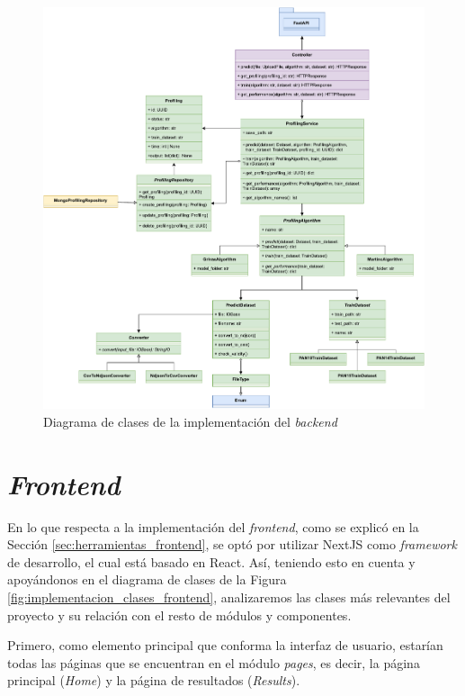 \bigskip
\begin{figure}[H]
	\centering
	\includegraphics[width=\textwidth]{diagramas/clases_back.pdf}
	\caption{Diagrama de clases de la implementación del \textit{backend}}
	\label{fig:implementacion_clases_backend}
\end{figure}

\section{\textit{Frontend}}

En lo que respecta a la implementación del \textit{frontend}, como se explicó en la Sección \ref{sec:herramientas_frontend}, se optó
por utilizar NextJS como \textit{framework} de desarrollo, el cual está basado en React. Así, teniendo esto en cuenta y apoyándonos
en el diagrama de clases de la Figura \ref{fig:implementacion_clases_frontend}, analizaremos
las clases más relevantes del proyecto y su relación con el resto de módulos y componentes.

\bigskip
Primero, como elemento principal que conforma la interfaz de usuario, estarían todas las páginas que se encuentran en el módulo \textit{pages}, es decir,
la página principal (\textit{Home}) y la página de resultados (\textit{Results}).


